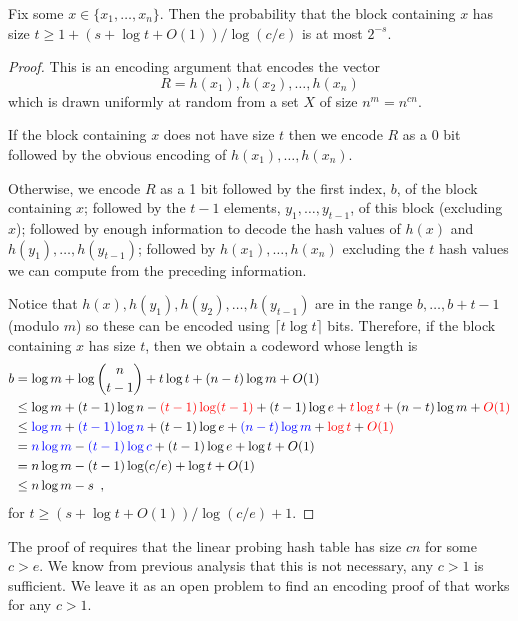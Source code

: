 \documentclass{patmorin}
\begin{document}
\begin{thm}
  Fix some $x\in\{x_1,\ldots,x_n\}$. Then the probability that the block
  containing $x$ has size $t\ge 1+(s+\log t + O(1))/\log(c/e)$ is at most $2^{-s}$.
\end{thm}

\begin{proof}
  This is an encoding argument that encodes the vector 
  \[
     R = h(x_1),h(x_2),\ldots,h(x_n)
  \]
  which is drawn uniformly at random from a set $X$ of size $n^{m}=n^{cn}$.
  
  If the block containing $x$ does not have size $t$ then we encode $R$
  as a 0 bit followed by the obvious encoding of $h(x_1),\ldots,h(x_n)$.
  
  Otherwise, we encode $R$ as a 1 bit followed by the first index,
  $b$, of the block containing $x$; followed by the $t-1$ elements,
  $y_1,\ldots,y_{t-1}$, of this block (excluding $x$); followed
  by enough information to decode the hash values of $h(x)$ and
  $h(y_1),\ldots,h(y_{t-1})$; followed by $h(x_1),\ldots,h(x_n)$ excluding
  the $t$ hash values we can compute from the preceding information.

  Notice that $h(x),h(y_1),h(y_2),\ldots,h(y_{t-1})$ are in the range
  $b,\ldots,b+t-1$ (modulo $m$) so these can be encoded using $\lceil
  t\log t\rceil$ bits.  Therefore, if the block containing $x$ has size $t$,
  then we obtain a codeword whose length is
  \begin{align*}
    b & = \log m + \log\binom{n}{t-1} + t\log t + (n-t)\log m + O(1) \\
       & \le \log m + (t-1)\log n - 
           {\color{red}(t-1)\log(t-1)} + (t-1)\log e + {\color{red}t\log t} + (n-t)\log m + {\color{red}O(1)}\\
       & \le {\color{blue}\log m} + {\color{blue}(t-1)\log n} + (t-1)\log e + {\color{blue}(n-t)\log m} + {\color{red}\log t}+ {\color{red} O(1)}\\
       & = {\color{blue}n\log m} - {\color{blue}(t-1)\log c} + (t-1)\log e + \log t + O(1) \\
       & = n\log m - (t-1)\log(c/e) + \log t + O(1) \\
       & \le n\log m - s \enspace ,
  \end{align*}
  for $t\ge (s+\log t+O(1))/\log (c/e) + 1$.
\end{proof}

\begin{rem}
  The proof of  requires that the linear probing
  hash table has size $cn$ for some $c>e$.  We know from previous analysis
  that this is not necessary, any $c>1$ is sufficient. We leave it as an open
  problem to find an encoding proof of  that works
  for any $c>1$.
\end{rem}
\end{document}
